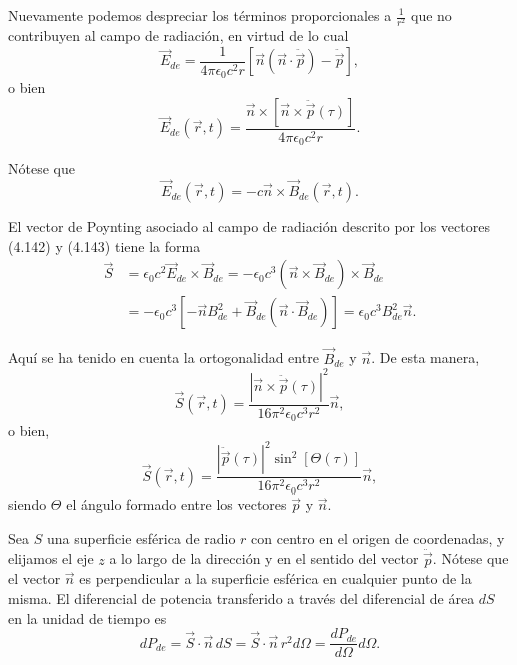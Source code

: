 \documentclass[12pt,a4paper]{book}
\begin{document}
Nuevamente podemos despreciar los términos proporcionales a $\frac{1}{r^2}$ que no contribuyen al campo de radiación, en virtud de lo cual
\begin{equation}
\vec{E}_{de} = \frac{1}{4\pi\epsilon_0 c^2r}[\vec{n}(\vec{n} \cdot \ddot{\vec{p}}) - \ddot{\vec{p}}],
\end{equation}
o bien
\begin{equation}
\vec{E}_{de}(\vec{r}, t) = \frac{\vec{n} \times [\vec{n} \times \ddot{\vec{p}}(\tau)]}{4\pi\epsilon_0 c^2 r}.
\end{equation}

Nótese que
\begin{equation}
\vec{E}_{de}(\vec{r}, t) = -c\vec{n} \times \vec{B}_{de}(\vec{r}, t).
\end{equation}

El vector de Poynting asociado al campo de radiación descrito por los vectores (4.142) y (4.143) tiene la forma
\begin{align}
\vec{S} &= \epsilon_0 c^2\vec{E}_{de} \times \vec{B}_{de} = -\epsilon_0 c^3 (\vec{n} \times \vec{B}_{de}) \times \vec{B}_{de} \nonumber \\
&= -\epsilon_0 c^3 [-\vec{n}B_{de}^2 + \vec{B}_{de}(\vec{n} \cdot \vec{B}_{de})] = \epsilon_0c^3 B_{de}^2\vec{n}.
\end{align}

Aquí se ha tenido en cuenta la ortogonalidad entre $\vec{B}_{de}$ y $\vec{n}$. De esta manera,
\begin{equation}
\vec{S}(\vec{r}, t) = \frac{|\vec{n} \times \ddot{\vec{p}}(\tau)|^2}{16\pi^2\epsilon_0 c^3 r^2}\vec{n},
\end{equation}
o bien,
\begin{equation}
\vec{S}(\vec{r}, t) = \frac{|\ddot{\vec{p}}(\tau)|^2\sin^2[\Theta(\tau)]}{16\pi^2\epsilon_0c^3 r^2}\vec{n},
\end{equation}
siendo $\Theta$ el ángulo formado entre los vectores $\ddot{\vec{p}}$ y $\vec{n}$.

Sea $S$ una superficie esférica de radio $r$ con centro en el origen de coordenadas, y elijamos el eje $z$ a lo largo de la dirección y en el sentido del vector $\ddot{\vec{p}}$. Nótese que el vector $\vec{n}$ es perpendicular a la superficie esférica en cualquier punto de la misma. El diferencial de potencia transferido a través del diferencial de área $dS$ en la unidad de tiempo es
\begin{equation}
dP_{de} = \vec{S} \cdot \vec{n} \, dS = \vec{S} \cdot \vec{n} \, r^2 d\Omega = \frac{dP_{de}}{d\Omega}d\Omega.
\end{equation}
\end{document}
